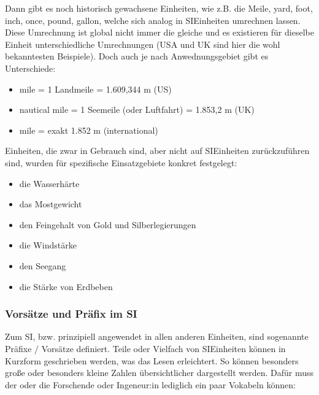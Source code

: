 \documentclass[letterpaper,10pt,english]{jupyterBook}
\begin{document}
\sphinxAtStartPar
Dann gibt es noch historisch gewachsene Einheiten, wie z.B. die Meile, yard, foot, inch, once, pound, gallon, welche sich analog in SI\sphinxhyphen{}Einheiten umrechnen lassen. Diese Umrechnung ist global nicht immer die gleiche und es existieren für dieselbe Einheit unterschiedliche Umrechnungen (USA und UK sind hier die wohl bekanntesten Beispiele). Doch auch je nach Anwednungsgebiet gibt es Unterschiede:
\begin{itemize}
\item {} 
 mile = 1 Landmeile = 1.609,344 m (US)

\item {} 
 nautical mile = 1 Seemeile (oder Luftfahrt) = 1.853,2 m (UK)

\item {} 
 mile = exakt 1.852 m (international)

\end{itemize}

\sphinxAtStartPar
Einheiten, die zwar in Gebrauch sind, aber nicht auf SI\sphinxhyphen{}Einheiten zurückzuführen sind, wurden für spezifische Einsatzgebiete konkret festgelegt:
\begin{itemize}
\item {} 
\sphinxAtStartPar
die Wasserhärte

\item {} 
\sphinxAtStartPar
das Mostgewicht

\item {} 
\sphinxAtStartPar
den Feingehalt von Gold\sphinxhyphen{} und Silberlegierungen

\item {} 
\sphinxAtStartPar
die Windstärke

\item {} 
\sphinxAtStartPar
den Seegang

\item {} 
\sphinxAtStartPar
die Stärke von Erdbeben

\end{itemize}


\subsubsection{Vorsätze und Präfix im SI}
\label{\detokenize{content/1_Messen_Einheit:vorsatze-und-prafix-im-si}}
\sphinxAtStartPar
Zum SI, bzw. prinzipiell angewendet in allen anderen Einheiten, sind sogenannte Präfixe / Vorsätze definiert. Teile oder Vielfach von SI\sphinxhyphen{}Einheiten können in Kurzform geschrieben werden, was das Lesen erleichtert. So können besonders große oder besonders kleine Zahlen übersichtlicher dargestellt werden. Dafür muss der oder die Forschende oder Ingeneur:in lediglich ein paar Vokabeln können:
\end{document}
